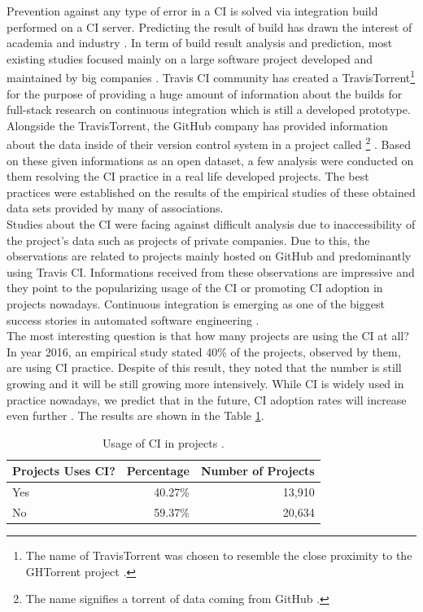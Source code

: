 Prevention against any type of error in a CI is solved via integration build performed on a CI server. Predicting the result of build has drawn the interest of academia and industry \cite{ResultsOfCIbuild}. In term of build result analysis and prediction, most existing studies focused mainly on a large software project developed and maintained by big companies \cite{ResultsOfCIbuild}. Travis CI community has created a TravisTorrent\footnote{The name of TravisTorrent was chosen to resemble the close proximity to the GHTorrent project \cite{TravisTorrentWEBPAGE}.} \cite{TravisTorrent} for the purpose of providing a huge amount of information about the builds for full-stack research on continuous integration which is still a developed prototype. Alongside the TravisTorrent, the GitHub company has provided information about the data inside of their version control system in a project called \footnote{The name signifies a torrent of data coming from GitHub \cite{GHTorrentWEBPAGE}.} \cite{GHTorrent}. Based on these given informations as an open dataset, a few analysis were conducted on them resolving the CI practice in a real life developed projects. The best practices were established on the results of the empirical studies of these obtained data sets provided by many of associations.\\

Studies about the CI were facing against difficult analysis due to inaccessibility of the project's data such as projects of private companies. Due to this, the observations are related to projects mainly hosted on GitHub and predominantly using Travis CI. Informations received from these observations are impressive and they point to the popularizing usage of the CI or promoting CI adoption in projects nowadays. Continuous integration is emerging as one of the biggest success stories in automated software engineering \cite{COPE}.\\

The most interesting question is that how many projects are using the CI at all? In year 2016, an empirical study stated 40\% \cite{COPE} of the projects, observed by them, are using CI practice. Despite of this result, they noted that the number is still growing and it will be still growing more intensively. While CI is widely used in practice nowadays, we predict that in the future, CI adoption rates will increase even further \cite{COPE}. The results are shown in the Table \ref{table:CI_usage}.

\begin{table}[H]
    \centering
    \begin{tabular}{lrr}
        \hline
        Projects Uses CI? & Percentage & Number of Projects \\
        \hline
        Yes               & 40.27\%    & 13,910             \\
        No                & 59.37\%    & 20,634             \\
        \hline
    \end{tabular}
    \caption{Usage of CI in projects \cite{COPE}.}
    \label{table:CI_usage}
\end{table}

